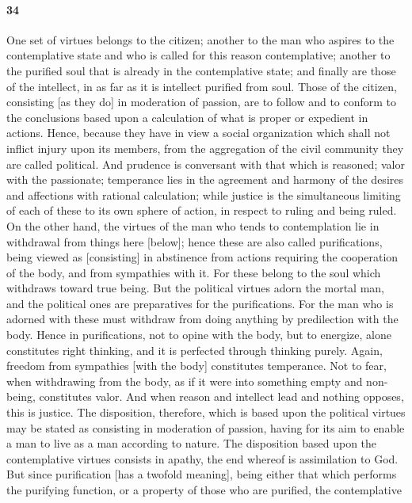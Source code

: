 \documentclass[12pt]{article}
\begin{document}
\paragraph{34} One set of virtues belongs to the citizen; another to the man
who aspires to the contemplative state and who is called for this reason
contemplative; another to the purified soul that is already in the
contemplative state; and finally are those of the intellect, in as far as it is
intellect purified from soul. Those of the citizen, consisting [as they do] in
moderation of passion, are to follow and to conform to the conclusions based
upon a calculation of what is proper or expedient in actions. Hence, because
they have in view a social organization which shall not inflict injury upon its
members, from the aggregation of the civil community they are called political.
And prudence is conversant with that which is reasoned; valor with the
passionate; temperance lies in the agreement and harmony of the desires and
affections with rational calculation; while justice is the simultaneous
limiting of each of these to its own sphere of action, in respect to ruling and
being ruled. On the other hand, the virtues of the man who tends to
contemplation lie in withdrawal from things here [below]; hence these are also
called purifications, being viewed as [consisting] in abstinence from actions
requiring the cooperation of the body, and from sympathies with it. For these
belong to the soul which withdraws toward true being. But the political virtues
adorn the mortal man, and the political ones are preparatives for the
purifications. For the man who is adorned with these must withdraw from doing
anything by predilection with the body. Hence in purifications, not to opine
with the body, but to energize, alone constitutes right thinking, and it is
perfected through thinking purely. Again, freedom from sympathies [with the
body] constitutes temperance. Not to fear, when withdrawing from the body, as
if it were into something empty and non-being, constitutes valor. And when
reason and intellect lead and nothing opposes, this is justice. The
disposition, therefore, which is based upon the political virtues may be stated
as consisting in moderation of passion, having for its aim to enable a man to
live as a man according to nature. The disposition based upon the contemplative
virtues consists in apathy, the end whereof is assimilation to God. But since
purification [has a twofold meaning], being either that which performs the
purifying function, or a property of those who are purified, the contemplative
\end{document}

